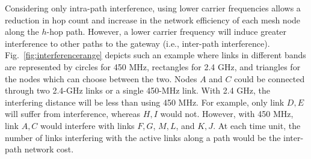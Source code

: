 Considering only intra-path interference, using lower carrier frequencies allows a
reduction in hop count and increase in the network efficiency of each mesh node along
the $h$-hop path. However, a lower carrier frequency will induce greater interference
to other paths to the gateway (i.e., inter-path interference). 
Fig.~\ref{fig:interferencerange} depicts such an example where
links in different bands are represented by circles for 450 MHz, rectangles for
2.4 GHz, and triangles for the nodes which can choose between the two.
Nodes $A$ and $C$ could be connected through two 2.4-GHz links or a single 450-MHz link.
With 2.4 GHz, the interfering distance will be less than using 450 MHz. For example, only 
link $D,E$ will suffer from interference, whereas $H,I$ would not. However, with 450 MHz,
link $A,C$ would interfere with links $F,G$, $M,L$, and $K,J$. At each time unit, the number of
links interfering with the active links along a path would be the inter-path network cost.

